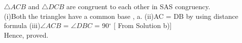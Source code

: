 $\triangle ACB$ and $\triangle DCB$ are congruent to each other in SAS congruency.
\\
(i)Both the triangles have a common base , a.
\newline
(ii)AC = DB by using distance formula
\newline
(iii)$\angle ACB$ = $\angle DBC$ = 90$^{\circ}$ [ From Solution b)]
\\
Hence, proved.
